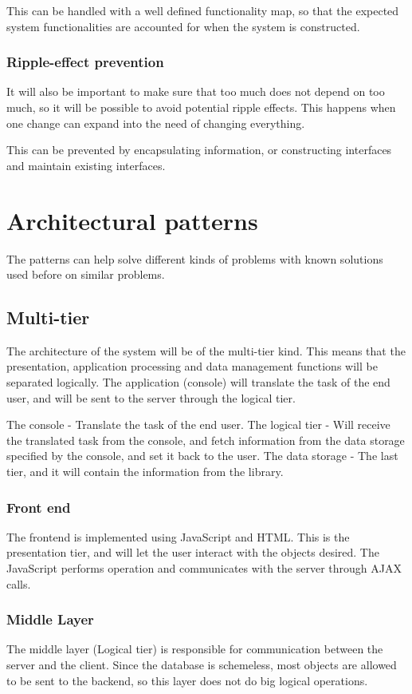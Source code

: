 This can be handled with a well defined functionality map, so that the expected system functionalities are accounted for when the system is constructed. 

\subsubsection{Ripple-effect prevention}
It will also be important to make sure that too much does not depend on too much, so it will be possible to avoid potential ripple effects. This happens when one change can expand into the need of changing everything. 

This can be prevented by encapsulating information, or constructing interfaces and maintain existing interfaces. 


\section{Architectural patterns} \label{Architectural patterns}
The patterns can help solve different kinds of problems with known solutions used before on similar problems.

\subsection{Multi-tier}
The architecture of the system will be of the multi-tier kind. This means that the presentation, application processing and data management functions will be separated logically. The application (console) will translate the task of the end user, and will be sent to the server through the logical tier.

The console - Translate the task of the end user.
The logical tier - Will receive the translated task from the console, and fetch information from the data storage specified by the console, and set it back to the user.
The data storage - The last tier, and it will contain the information from the library.

\subsubsection{Front end}
The frontend is implemented using JavaScript and HTML. This is the presentation tier, and will let the user interact with the objects desired. The JavaScript performs operation and communicates with the server through AJAX calls. 

\subsubsection{Middle Layer}
The middle layer (Logical tier) is responsible for communication between the server and the client. Since the database is schemeless, most objects are allowed to be sent to the backend, so this layer does not do big logical operations.


